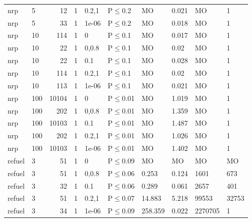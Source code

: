 \begin{longtable}{llrrllllll}
 nrp           & 5        &     	12 & 1 & 0.2,1 & P$\leq$0.2   & MO       & 0.021    & MO      & 1      \\
 nrp           & 5        &     	33 & 1 & 1e-06 & P$\leq$0.2   & MO       & 0.018    & MO      & 1      \\
 nrp           & 10       &    	114 & 1 & 0     & P$\leq$0.1   & MO       & 0.017    & MO      & 1      \\
 nrp           & 10       &     	22 & 1 & 0,0.8 & P$\leq$0.1   & MO       & 0.02     & MO      & 1      \\
 nrp           & 10       &     	22 & 1 & 0.1   & P$\leq$0.1   & MO       & 0.028    & MO      & 1      \\
 nrp           & 10       &    	114 & 1 & 0.2,1 & P$\leq$0.1   & MO       & 0.02     & MO      & 1      \\
 nrp           & 10       &    	113 & 1 & 1e-06 & P$\leq$0.1   & MO       & 0.021    & MO      & 1      \\
 nrp           & 100      &  	10104 & 1 & 0     & P$\leq$0.01  & MO       & 1.019    & MO      & 1      \\
 nrp           & 100      &    	202 & 1 & 0,0.8 & P$\leq$0.01  & MO       & 1.359    & MO      & 1      \\
 nrp           & 100      &  	10103 & 1 & 0.1   & P$\leq$0.01  & MO       & 1.487    & MO      & 1      \\
 nrp           & 100      &    	202 & 1 & 0.2,1 & P$\leq$0.01  & MO       & 1.026    & MO      & 1      \\
 nrp           & 100      &  	10103 & 1 & 1e-06 & P$\leq$0.01  & MO       & 1.402    & MO      & 1      \\
 refuel        & 3        &     	51 & 1 & 0     & P$\leq$0.09  & MO       & MO       & MO      & MO     \\
 refuel        & 3        &     	51 & 1 & 0,0.8 & P$\leq$0.06  & 0.253    & 0.124    & 1601    & 673    \\
 refuel        & 3        &     	32 & 1 & 0.1   & P$\leq$0.06  & 0.289    & 0.061    & 2657    & 401    \\
 refuel        & 3        &     	51 & 1 & 0.2,1 & P$\leq$0.07  & 14.883   & 5.218    & 99553   & 32753  \\
 refuel        & 3        &     	34 & 1 & 1e-06 & P$\leq$0.09  & 258.359  & 0.022    & 2270705 & 1      \\
\bottomrule
\end{longtable}
